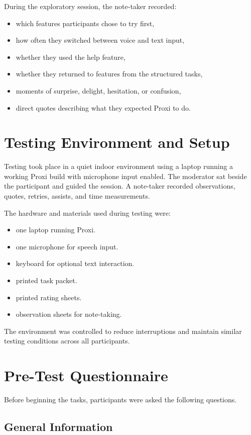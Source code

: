 \documentclass[12pt, titlepage]{article}
\begin{document}
During the exploratory session, the note-taker recorded:
\begin{itemize}
    \item which features participants chose to try first,
    \item how often they switched between voice and text input,
    \item whether they used the help feature,
    \item whether they returned to features from the structured tasks,
    \item moments of surprise, delight, hesitation, or confusion,
    \item direct quotes describing what they expected Proxi to do.
\end{itemize}

\section{Testing Environment and Setup}

Testing took place in a quiet indoor environment using a laptop running
a working Proxi build with microphone input enabled. The moderator sat
beside the participant and guided the session. A note-taker recorded
observations, quotes, retries, assists, and time measurements.

The hardware and materials used during testing were:
\begin{itemize}
    \item one laptop running Proxi.
    \item one microphone for speech input.
    \item keyboard for optional text interaction.
    \item printed task packet.
    \item printed rating sheets.
    \item observation sheets for note-taking.
\end{itemize}

The environment was controlled to reduce interruptions and maintain
similar testing conditions across all participants.

\section{Pre-Test Questionnaire}

Before beginning the tasks, participants were asked the following
questions.

\subsection{General Information}
\end{document}
